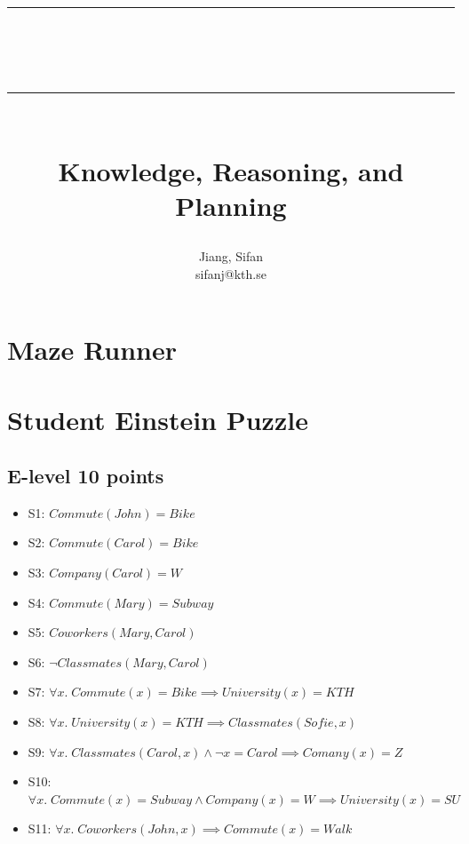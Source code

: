 \documentclass[11pt,a4paper]{article}
\begin{document}
\title{\sc\vspace{3cm}\hrule\vspace{0.3cm}{\LARGE DD2380}\\\vspace{0.1cm}{\Large Artificial Intelligence}\vspace{0.3cm}\hrule\vspace{1.5cm}{\Large Assignment 3}\\{\large Knowledge, Reasoning, and Planning}}
\author{Jiang, Sifan\\sifanj@kth.se}
\maketitle
\newpage


\section{Maze Runner}


\section{Student Einstein Puzzle}
\subsection{E-level 10 points}
\begin{itemize}
	\item S1: $Commute(John) = Bike$
	\item S2: $Commute(Carol) = Bike$
	\item S3: $Company(Carol) = W$
	\item S4: $Commute(Mary) = Subway$
	\item S5: $Coworkers(Mary, Carol)$
	\item S6: $\lnot Classmates(Mary, Carol)$
	\item S7: $\forall x. \; Commute(x) = Bike \implies University(x) = KTH$
	\item S8: $\forall x. \; University(x) = KTH \implies Classmates(Sofie, x)$
	\item S9: $\forall x. \; Classmates(Carol, x) \wedge \lnot x = Carol \implies Comany(x) = Z$
	\item S10: $\forall x. \; Commute(x) = Subway \wedge Company(x) = W \implies University(x) = SU$
	\item S11: $\forall x. \; Coworkers(John, x) \implies Commute(x) = Walk$
\end{itemize}
\end{document}
